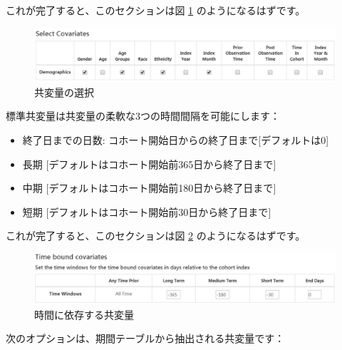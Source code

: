 \documentclass[
  11pt]{book}
\providecommand{\tightlist}{%
  \setlength{\itemsep}{0pt}\setlength{\parskip}{0pt}}
\theoremstyle{definition}
\theoremstyle{definition}
\theoremstyle{definition}
\theoremstyle{definition}
\theoremstyle{remark}
\begin{document}
これが完了すると、このセクションは図 \ref{fig:covariateSettings2} のようになるはずです。

\begin{figure}

{\centering \includegraphics[width=1\linewidth]{images/PatientLevelPrediction/covariateSettings2} 

}

\caption{共変量の選択}\label{fig:covariateSettings2}
\end{figure}

標準共変量は共変量の柔軟な3つの時間間隔を可能にします：

\begin{itemize}
\tightlist
\item
  終了日までの日数: コホート開始日からの終了日まで{[}デフォルトは0{]}
\item
  長期 {[}デフォルトはコホート開始前365日から終了日まで{]}
\item
  中期 {[}デフォルトはコホート開始前180日から終了日まで{]}
\item
  短期 {[}デフォルトはコホート開始前30日から終了日まで{]}
\end{itemize}

これが完了すると、このセクションは図 \ref{fig:covariateSettings3} のようになるはずです。

\begin{figure}

{\centering \includegraphics[width=1\linewidth]{images/PatientLevelPrediction/covariateSettings3} 

}

\caption{時間に依存する共変量}\label{fig:covariateSettings3}
\end{figure}

次のオプションは、期間テーブルから抽出される共変量です：
\end{document}
